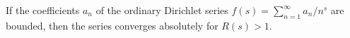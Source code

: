 If the coefficients $a_n$ of the ordinary Dirichlet series $f(s) = \sum_{n=1}^\infty a_n / n^s$ are bounded, then the series converges absolutely for $R(s) > 1$.
